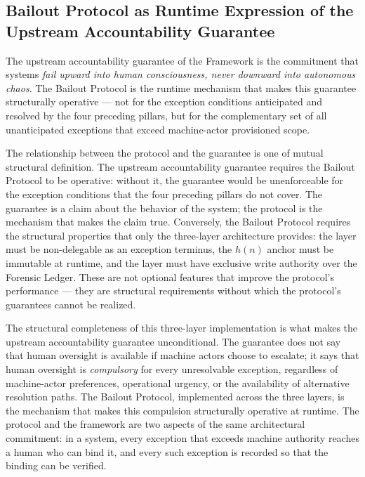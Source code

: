 \subsection{Bailout Protocol as Runtime Expression of the Upstream Accountability Guarantee}\label{sec:runtime-expression}

The upstream accountability guarantee of the \bxthree{} Framework is the commitment that \bxthree{} systems \emph{fail upward into human consciousness, never downward into autonomous chaos}. The Bailout Protocol is the runtime mechanism that makes this guarantee structurally operative --- not for the exception conditions anticipated and resolved by the four preceding pillars, but for the complementary set of all unanticipated exceptions that exceed machine-actor provisioned scope.

The relationship between the protocol and the guarantee is one of mutual structural definition. The upstream accountability guarantee requires the Bailout Protocol to be operative: without it, the guarantee would be unenforceable for the exception conditions that the four preceding pillars do not cover. The guarantee is a claim about the behavior of the system; the protocol is the mechanism that makes the claim true. Conversely, the Bailout Protocol requires the structural properties that only the \bxthree{} three-layer architecture provides: the \purpose{} layer must be non-delegable as an exception terminus, the $h(n)$ anchor must be immutable at runtime, and the \fact{} layer must have exclusive write authority over the Forensic Ledger. These are not optional features that improve the protocol's performance --- they are structural requirements without which the protocol's guarantees cannot be realized.

The structural completeness of this three-layer implementation is what makes the upstream accountability guarantee unconditional. The guarantee does not say that human oversight is available if machine actors choose to escalate; it says that human oversight is \emph{compulsory} for every unresolvable exception, regardless of machine-actor preferences, operational urgency, or the availability of alternative resolution paths. The Bailout Protocol, implemented across the three \bxthree{} layers, is the mechanism that makes this compulsion structurally operative at runtime. The protocol and the framework are two aspects of the same architectural commitment: in a \bxthree{} system, every exception that exceeds machine authority reaches a human who can bind it, and every such exception is recorded so that the binding can be verified.

